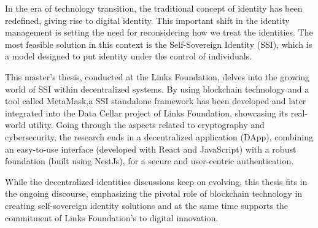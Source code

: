\sommario
In the era of technology transition, the traditional concept of identity has been redefined, giving rise to digital identity. This important shift in the identity management 
is setting the need for reconsidering how we treat the identities. The most feasible solution in this context is the Self-Sovereign Identity (SSI), which is a model 
designed to put identity under the control of individuals.

This master's thesis, conducted at the Links Foundation, delves into the growing world of SSI within decentralized systems. By using blockchain technology and a tool called 
MetaMask,a SSI standalone framework has been developed and later integrated into the Data Cellar project of Links Foundation, showcasing its real-world utility. Going 
through the aspects related to cryptography and cybersecurity, the research ends in a decentralized application (DApp), combining an easy-to-use interface (developed with 
React and JavaScript) with a robust foundation (built using NestJs), for a secure and user-centric authentication.

While the decentralized identities discussions keep on evolving, this thesis fits in the ongoing discourse, emphasizing the pivotal role of blockchain technology 
in creating self-sovereign identity solutions and at the same time supports the commitment of Links Foundation's to digital innovation.